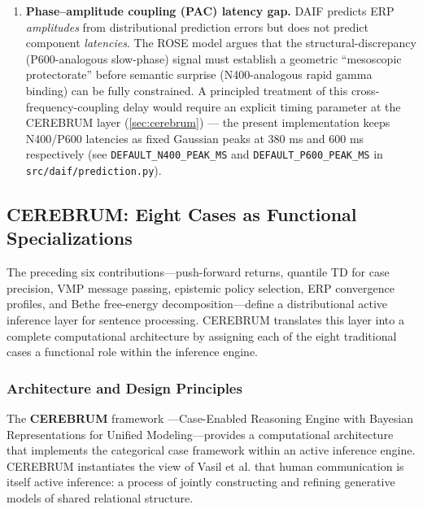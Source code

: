 \documentclass[
]{article}
\begin{document}
\begin{enumerate}
  \(H[q]\) at the case-marked noun than the German example, where
  word-final case markers compete with positional disambiguation and
  gender / number ambiguity in the determiner system.
\item
  \textbf{Phase--amplitude coupling (PAC) latency gap.} DAIF predicts
  ERP \emph{amplitudes} from distributional prediction errors but does
  not predict component \emph{latencies}. The ROSE model
  \citep{murphy2023rose} argues that the structural-discrepancy
  (P600-analogous slow-phase) signal must establish a geometric
  ``mesoscopic protectorate'' before semantic surprise (N400-analogous
  rapid gamma binding) can be fully constrained. A principled treatment
  of this cross-frequency-coupling delay would require an explicit
  timing parameter at the CEREBRUM layer (\autoref{sec:cerebrum}) ---
  the present implementation keeps N400/P600 latencies as fixed Gaussian
  peaks at 380 ms and 600 ms respectively (see
  \texttt{DEFAULT\_N400\_PEAK\_MS} and \texttt{DEFAULT\_P600\_PEAK\_MS}
  in \texttt{src/daif/prediction.py}).
\end{enumerate}

\subsection{CEREBRUM: Eight Cases as Functional
Specializations}\label{sec:cerebrum}

The preceding six contributions---push-forward returns, quantile TD for
case precision, VMP message passing, epistemic policy selection, ERP
convergence profiles, and Bethe free-energy decomposition---define a
distributional active inference layer for sentence processing. CEREBRUM
translates this layer into a complete computational architecture by
assigning each of the eight traditional cases a functional role within
the inference engine.

\subsubsection{Architecture and Design
Principles}\label{architecture-and-design-principles}

The \textbf{CEREBRUM} framework
\citep{friedman2024cerebrum}---Case-Enabled Reasoning Engine with
Bayesian Representations for Unified Modeling---provides a computational
architecture that implements the categorical case framework within an
active inference engine. CEREBRUM instantiates the view of Vasil et al.
\citeyearpar{vasil2020world} that human communication is itself active
inference: a process of jointly constructing and refining generative
models of shared relational structure.
\end{document}
